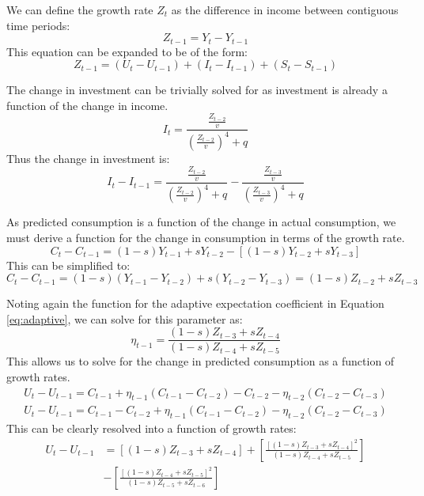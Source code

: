 We can define the growth rate $Z_t$ as the difference in income between contiguous time periods:
\begin{equation}
    Z_{t-1}=Y_t-Y_{t-1}
\end{equation}
This equation can be expanded to be of the form:
\begin{equation*}
    Z_{t-1}=(U_t-U_{t-1})+(I_t-I_{t-1})+(S_t-S_{t-1})
\end{equation*}

The change in investment can be trivially solved for as investment is already a function of the change in income.
\begin{equation*}
    I_t=\frac{\frac{Z_{t-2}}{v}}{\left(\frac{Z_{t-2}}{v}\right)^4+q}
\end{equation*}
Thus the change in investment is:
\begin{equation}
    I_t-I_{t-1}=\frac{\frac{Z_{t-2}}{v}}{\left(\frac{Z_{t-2}}{v}\right)^4+q}-\frac{\frac{Z_{t-3}}{v}}{\left(\frac{Z_{t-3}}{v}\right)^4+q}
\end{equation}

As predicted consumption is a function of the change in actual consumption, we must derive a function for the change in consumption in terms of the growth rate.
\begin{equation*}
    C_t-C_{t-1}=(1-s)Y_{t-1}+sY_{t-2}-[(1-s)Y_{t-2}+sY_{t-3}]
\end{equation*}
This can be simplified to:
\begin{equation}
    C_t-C_{t-1}=(1-s)(Y_{t-1}-Y_{t-2})+s(Y_{t-2}-Y_{t-3})=(1-s)Z_{t-2}+sZ_{t-3}
\end{equation}

Noting again the function for the adaptive expectation coefficient in Equation \ref{eq:adaptive}, we can solve for this parameter as:
\begin{equation}
    \eta_{t-1}=\frac{(1-s)Z_{t-3}+sZ_{t-4}}{(1-s)Z_{t-4}+sZ_{t-5}}
\end{equation}
This allows us to solve for the change in predicted consumption as a function of growth rates. 
\begin{gather*}
    U_t-U_{t-1}=C_{t-1}+\eta_{t-1}(C_{t-1}-C_{t-2})-C_{t-2}-\eta_{t-2}(C_{t-2}-C_{t-3})\\
    U_t-U_{t-1}=C_{t-1}-C_{t-2}+\eta_{t-1}(C_{t-1}-C_{t-2})-\eta_{t-2}(C_{t-2}-C_{t-3})
\end{gather*}
This can be clearly resolved into a function of growth rates:
\begin{equation}
\begin{split}
    U_t-U_{t-1}& =[(1-s)Z_{t-3}+sZ_{t-4}]+\left[\frac{[(1-s)Z_{t-3}+sZ_{t-4}]^2}{(1-s)Z_{t-4}+sZ_{t-5}}\right]\\
    & -\left[\frac{[(1-s)Z_{t-4}+sZ_{t-5}]^2}{(1-s)Z_{t-5}+sZ_{t-6}}\right]
\end{split}
\end{equation}

